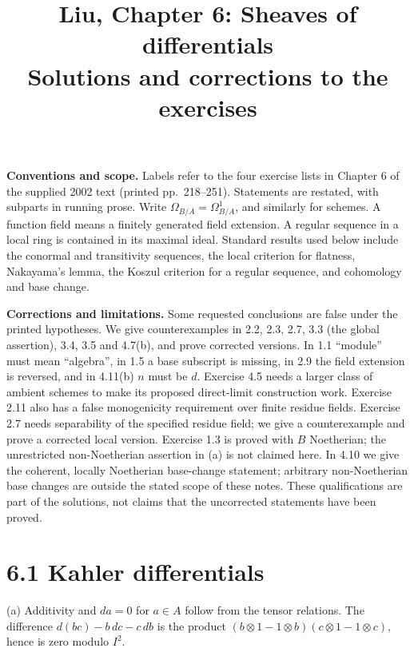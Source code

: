\documentclass[11pt]{article}
\title{Liu, Chapter 6: Sheaves of differentials\\[2pt]\large Solutions and corrections to the exercises}
\author{}
\date{}
\let\chapterexercise\exercise
\renewcommand{\exercise}[2]{\Needspace{8\baselineskip}\chapterexercise{#1}{#2}}
\begin{document}
\maketitle
\textbf{Conventions and scope.} Labels refer to the four exercise lists in Chapter 6 of the supplied 2002 text (printed pp.~218--251). Statements are restated, with subparts in running prose. Write $\Omega_{B/A}=\Omega^1_{B/A}$, and similarly for schemes. A function field means a finitely generated field extension. A regular sequence in a local ring is contained in its maximal ideal. Standard results used below include the conormal and transitivity sequences, the local criterion for flatness, Nakayama's lemma, the Koszul criterion for a regular sequence, and cohomology and base change.

\textbf{Corrections and limitations.} Some requested conclusions are false under the printed hypotheses. We give counterexamples in 2.2, 2.3, 2.7, 3.3 (the global assertion), 3.4, 3.5 and 4.7(b), and prove corrected versions. In 1.1 ``module'' must mean ``algebra'', in 1.5 a base subscript is missing, in 2.9 the field extension is reversed, and in 4.11(b) $n$ must be $d$. Exercise 4.5 needs a larger class of ambient schemes to make its proposed direct-limit construction work. Exercise 2.11 also has a false monogenicity requirement over finite residue fields. Exercise 2.7 needs separability of the specified residue field; we give a counterexample and prove a corrected local version. Exercise 1.3 is proved with $B$ Noetherian; the unrestricted non-Noetherian assertion in (a) is not claimed here. In 4.10 we give the coherent, locally Noetherian base-change statement; arbitrary non-Noetherian base changes are outside the stated scope of these notes. These qualifications are part of the solutions, not claims that the uncorrected statements have been proved.

\section*{6.1 Kahler differentials}

\pf
(a) Additivity and $da=0$ for $a\in A$ follow from the tensor relations. The difference $d(bc)-b\,dc-c\,db$ is the product $(b\otimes1-1\otimes b)(c\otimes1-1\otimes c)$, hence is zero modulo $I^2$.
\end{document}
